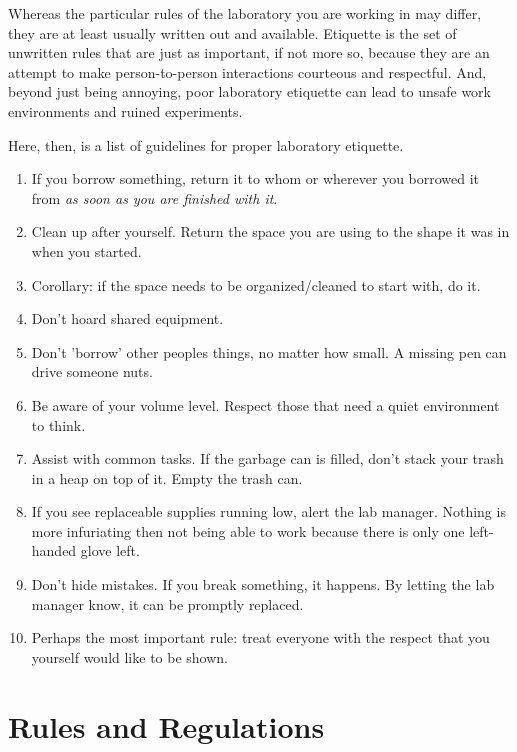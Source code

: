 \documentclass[11pt]{article}
\begin{document}
Whereas the particular rules of the laboratory you are working in may differ, they are at least usually written out and available. Etiquette is the set of unwritten rules that are just as important, if not more so, because they are an attempt to make person-to-person interactions courteous and respectful. And, beyond just being annoying, poor laboratory etiquette can lead to unsafe work environments and ruined experiments.
\vspace{.5cm}

\hspace{-0.6cm}Here, then, is a list of guidelines for proper laboratory etiquette.

\begin{enumerate}[noitemsep]
  \item If you borrow something, return it to whom or wherever you borrowed it from \textit{as soon as you are finished with it}.
  \item Clean up after yourself. Return the space you are using to the shape it was in when you started.
  \item Corollary: if the space needs to be organized/cleaned to start with, do it.
  \item Don't hoard shared equipment.
  \item Don't 'borrow' other peoples things, no matter how small. A missing pen can drive someone nuts.
  \item Be aware of your volume level. Respect those that need a quiet environment to think. 
  \item Assist with common tasks. If the garbage can is filled, don't stack your trash in a heap on top of it. Empty the trash can.
  \item If you see replaceable supplies running low, alert the lab manager. Nothing is more infuriating then not being able to work because there is only one left-handed glove left.
  \item Don't hide mistakes. If you break something, it happens. By letting the lab manager know, it can be promptly replaced.
  \item Perhaps the most important rule: treat everyone with the respect that you yourself would like to be shown.

\end{enumerate}


\section{Rules and Regulations}
\label{sec:Rules}
\end{document}
